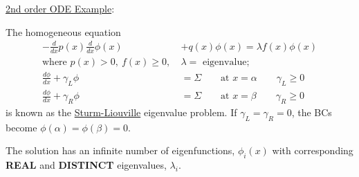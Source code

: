 \documentclass[12pt]{article}
\newcommand{\ve}[1]{\ensuremath{\mathbf{#1}}}
\newcommand{\Macro}{\ensuremath{\Sigma}}
\begin{document}
%

\vspace*{1em}
\underline{2nd order ODE Example}:

The homogeneous equation %
%
\begin{align}
-\frac{d}{dx}p(x) \frac{d}{dx}\phi(x) &+ q(x)\phi(x) = \lambda f(x) \phi(x) \nonumber \\
\text{where }p(x) > 0, \:f(x) \geq 0,\: &\lambda = \text{ eigenvalue;}\nonumber \\
\frac{d\phi}{dx} + \gamma_L \phi &= \Macro \qquad \text{at }x=\alpha \qquad \gamma_L \geq 0  \nonumber \\
\frac{d\phi}{dx} + \gamma_R \phi &= \Macro \qquad \text{at }x=\beta \qquad \gamma_R \geq 0\nonumber 
\end{align}
%
is known as the \underline{Sturm-Liouville} eigenvalue problem. If $\gamma_L = \gamma_R = 0$, the BCs become $\phi(\alpha) = \phi(\beta) = 0$.

The solution has an infinite number of eigenfunctions, $\phi_i(x)$ with corresponding \textbf{REAL} and \textbf{DISTINCT} eigenvalues, $\lambda_i$. 
\end{document}
